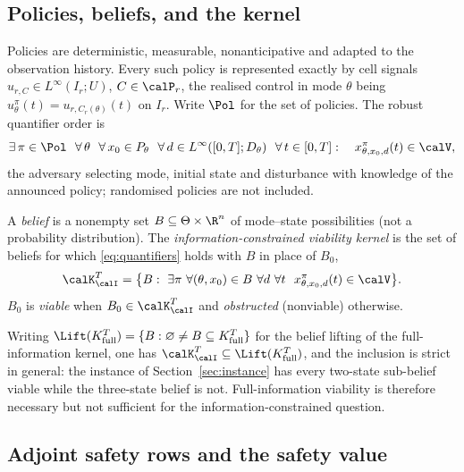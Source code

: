 \subsection{Policies, beliefs, and the kernel}

Policies are deterministic, measurable, nonanticipative and adapted to the observation history. Every such policy is represented exactly by cell signals $u_{r,C}\in L^\infty(I_r;U)$, $C\in\calP_r$, the realised control in mode $\theta$ being $u^\pi_\theta(t)=u_{r,C_r(\theta)}(t)$ on $I_r$. Write $\Pol$ for the set of policies. The robust quantifier order is
\begin{equation}\label{eq:quantifiers}
\exists\,\pi\in\Pol\ \ \forall\,\theta\ \ \forall\,x_0\in P_\theta\ \ \forall\,d\in L^\infty([0,T];D_\theta)\ \ \forall\,t\in[0,T]:\quad x^\pi_{\theta,x_0,d}(t)\in\calV ,
\end{equation}
the adversary selecting mode, initial state and disturbance with knowledge of the announced policy; randomised policies are not included.

\begin{definition}\label{def:kernel}
A \emph{belief} is a nonempty set $B\subseteq\Theta\times\R^n$ of mode--state possibilities (not a probability distribution). The \emph{information-constrained viability kernel} is the set of beliefs for which \eqref{eq:quantifiers} holds with $B$ in place of $B_0$,
\[
\calK^T_\calI=\bigl\{B:\ \exists\pi\ \forall(\theta,x_0)\in B\ \forall d\ \forall t\ \ x^\pi_{\theta,x_0,d}(t)\in\calV\bigr\}.
\]
$B_0$ is \emph{viable} when $B_0\in\calK^T_\calI$ and \emph{obstructed} (nonviable) otherwise.
\end{definition}

Writing $\Lift(K^T_{\mathrm{full}})=\{B:\varnothing\ne B\subseteq K^T_{\mathrm{full}}\}$ for the belief lifting of the full-information kernel, one has $\calK^T_\calI\subseteq\Lift(K^T_{\mathrm{full}})$, and the inclusion is strict in general: the instance of Section~\ref{sec:instance} has every two-state sub-belief viable while the three-state belief is not. Full-information viability is therefore necessary but not sufficient for the information-constrained question.

\subsection{Adjoint safety rows and the safety value}


